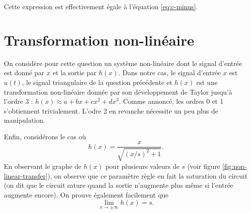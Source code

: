 Cette expression est effectivement égale à
l'équation \ref{eq:c-minus}.

\section{Transformation non-linéaire}

On considère pour cette question un système non-linéaire
dont le signal d'entrée est donné par $x$ et la sortie
par $h(x)$.
Dans notre cas, le signal d'entrée $x$ est $u(t)$,
le signal triangulaire de la question précédente et
$h(x)$ est une transformation non-linéaire donnée par
son développement de Taylor jusqu'à l'ordre 3 :
$h(x) \approx a+bx+cx^2+dx^3$.
Comme annoncé, les ordres 0 et 1 s'obtiennent trivialement.
L'odre 2 en revanche nécessite un peu plus de manipulation.

Enfin, considérons le cas où 
\[ h(x) = \frac{x}{\sqrt{(x/s)^2+1}}.\]
En observant le graphe de $h(x)$ pour plusieurs
valeurs de $s$ (voir figure \ref{fig:non-linear-transfer}),
on observe que ce paramètre règle en fait la saturation du circuit
(on dit que le circuit sature quand la sortie n'augmente plus
même si l'entrée augmente encore). 
On prouve également facilement que
\[ \lim_{x\to\pm\infty} h(x) = s.\]

